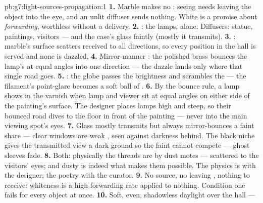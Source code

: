 \begin{solution}{pb:g7:light-sources-propagation:1}
\textbf{1.} Marble makes no : seeing needs  leaving
the object into the eye, and an unlit diffuser sends nothing.
White is a promise about \emph{forwarding}, worthless without a
delivery.
\textbf{2.} : the lamps, alone. Diffusers:
statue, paintings, visitors --- and the case's glass faintly
(mostly it transmits).
\textbf{3.} : marble's surface scatters received 
to all directions, so every position in the hall is served and
none is dazzled.
\textbf{4.} Mirror-manner : the polished brass bounces
the lamp's  at equal angles into one direction --- the
dazzle lands only where that single road goes.
\textbf{5.} : the globe passes the brightness and
scrambles the  --- the filament's point-glare becomes a
soft ball of .
\textbf{6.} By the bounce rule, a lamp shows in the varnish when
lamp and viewer sit at equal angles on either side of the
painting's surface. The designer places lamps high and steep, so
their bounced road dives to the floor in front of the painting
--- never into the main viewing spot's eyes.
\textbf{7.} Glass mostly transmits but always mirror-bounces a
faint share --- clear windows are weak , seen against
darkness behind. The black niche gives the transmitted view a
dark ground so the faint  cannot compete --- ghost
sleeves fade.
\textbf{8.} Both: physically the threads are  by dust
motes ---  scattered to the visitors' eyes; and dusty
 is indeed what makes them possible. The physics is with the
designer; the poetry with the curator.
\textbf{9.} No source, no leaving , nothing to receive:
whiteness is a high forwarding rate applied to nothing.
Condition one fails for every object at once.
\textbf{10.} Soft, even, shadowless daylight over the hall ---

\end{solution}
